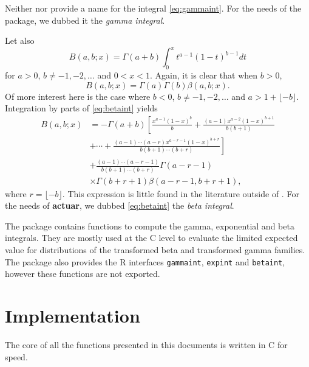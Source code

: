 \documentclass[x11names]{article}
\newcommand{\proglang}[1]{\textsf{#1}}
\newcommand{\pkg}[1]{\textbf{#1}}
\newcommand{\code}[1]{\texttt{#1}}
\begin{document}
Neither \citet{LossModels4e} nor \citet{Abramowitz:1972} provide a
name for the integral \eqref{eq:gammaint}. For the needs of the
package, we dubbed it the \emph{gamma integral}.

Let also
\begin{equation}
  \label{eq:betaint}
  B(a, b; x) = \Gamma(a + b) \int_0^x t^{a-1} (1-t)^{b-1} dt
\end{equation}
for $a > 0$, $b \neq -1, -2, \dots$ and $0 < x < 1$. Again, it is
clear that when $b > 0$,
\begin{equation*}
  B(a, b; x) = \Gamma(a) \Gamma(b) \beta(a, b; x).
\end{equation*}
Of more interest here is the case where $b < 0$,
$b \neq -1, -2, \dots$ and $a > 1 + \lfloor -b\rfloor$. Integration by
parts of \eqref{eq:betaint} yields
\begin{equation*}
  \begin{split}
    B(a, b; x)
    &= \displaystyle
    -\Gamma(a + b) \left[ \frac{x^{a-1} (1-x)^b}{b}
      + \frac{(a-1) x^{a-2} (1-x)^{b+1}}{b (b+1)} \right. \\
    &  \displaystyle\left.
      + \cdots + \frac{(a-1) \cdots (a-r) x^{a-r-1}
        (1-x)^{b+r}}{b (b+1) \cdots (b+r)} \right] \\
    &   \displaystyle
    + \frac{(a-1) \cdots (a-r-1)}{b (b+1) \cdots (b+r)}
    \Gamma(a-r-1) \\
    &  \times \Gamma(b+r+1) \beta(a-r-1, b+r+1),
  \end{split}
\end{equation*}
where $r = \lfloor -b\rfloor$. This expression is little found in the
literature outside of \citet{LossModels4e}. For the needs of
\pkg{actuar}, we dubbed \eqref{eq:betaint} the \emph{beta
  integral}.

The package contains functions to compute the gamma, exponential
and beta integrals. They are mostly used at the \proglang{C} level
to evaluate the limited expected value for distributions of the
transformed beta and transformed gamma families. The package also
provides the R interfaces \code{gammaint}, \code{expint} and
\code{betaint}, however these functions are not exported.


\section{Implementation}
\label{sec:implementation}

The core of all the functions presented in this documents is written
in \proglang{C} for speed.
\end{document}

